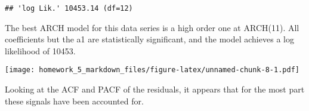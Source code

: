 \documentclass[]{article}
\newenvironment{Shaded}{\begin{snugshade}}{\end{snugshade}}
\newcommand{\KeywordTok}[1]{\textcolor[rgb]{0.13,0.29,0.53}{\textbf{#1}}}
\newcommand{\DataTypeTok}[1]{\textcolor[rgb]{0.13,0.29,0.53}{#1}}
\newcommand{\DecValTok}[1]{\textcolor[rgb]{0.00,0.00,0.81}{#1}}
\newcommand{\StringTok}[1]{\textcolor[rgb]{0.31,0.60,0.02}{#1}}
\newcommand{\CommentTok}[1]{\textcolor[rgb]{0.56,0.35,0.01}{\textit{#1}}}
\newcommand{\OtherTok}[1]{\textcolor[rgb]{0.56,0.35,0.01}{#1}}
\newcommand{\OperatorTok}[1]{\textcolor[rgb]{0.81,0.36,0.00}{\textbf{#1}}}
\newcommand{\NormalTok}[1]{#1}
\begin{document}
\begin{verbatim}
## 'log Lik.' 10453.14 (df=12)
\end{verbatim}

The best ARCH model for this data series is a high order one at
ARCH(11). All coefficients but the a1 are statistically significant, and
the model achieves a log likelihood of 10453.

\begin{Shaded}
\end{Shaded}

\texttt{[image: homework\_5\_markdown\_files/figure-latex/unnamed-chunk-8-1.pdf]}

Looking at the ACF and PACF of the residuals, it appears that for the
most part these signals have been accounted for.

\begin{Shaded}
\end{Shaded}
\end{document}
